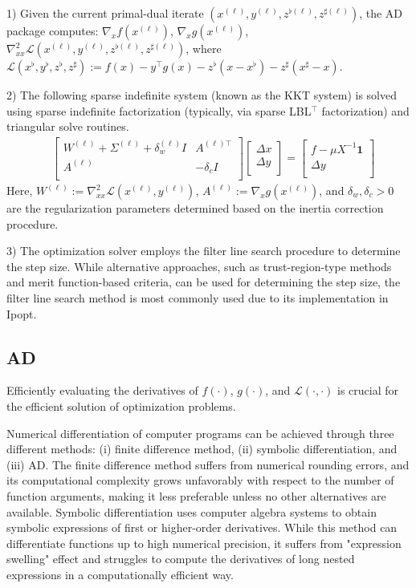 1) Given the current primal-dual iterate $(x^{(\ell)},y^{(\ell)},
z^{\flat(\ell)},z^{\sharp(\ell)})$, the AD package computes:
$\nabla_x f(x^{(\ell)})$, $\nabla_x g(x^{(\ell)})$, $\nabla^2_{xx}
\mathcal{L}(x^{(\ell)},y^{(\ell)},z^{\flat(\ell)},z^{\sharp(\ell)})$, where
$\mathcal{L}(x^{\flat},y^{\flat},z^{\flat},z^{\sharp}):=f(x) - y^\top
g(x) - z^\flat (x-x^\flat) - z^\sharp (x^\sharp-x)$.

2) The following sparse indefinite system (known as the KKT system) is
solved using sparse indefinite factorization (typically, via sparse
LBL$^\top$ factorization) and triangular solve routines.
\begin{align}\label{eqn:kkt-indefinite}
  &\begin{bmatrix}
    W^{(\ell)}  + \Sigma^{(\ell)} + \delta^{(\ell)}_w I& A^{(\ell)\top}\\
    A^{(\ell)} & -\delta_c I\\
  \end{bmatrix}
  \begin{bmatrix}
    \Delta x\\
    \Delta y\\
  \end{bmatrix}=
  \begin{bmatrix}
    f - \mu X^{-1} \boldsymbol{1}\\
    \Delta y\\
  \end{bmatrix}
\end{align}
Here, $W^{(\ell)}:=\nabla^{2}_{xx}\mathcal{L}(x^{(\ell)},y^{(\ell)})$,
$A^{(\ell)}:= \nabla_xg(x^{(\ell)})$, and $\delta_w, \delta_c>0$ are
the regularization parameters determined based on the inertia
correction procedure.

3) The optimization solver employs the filter line search procedure to
determine the step size. While alternative approaches, such as
trust-region-type methods and merit function-based criteria, can be
used for determining the step size, the filter line search method is
most commonly used due to its implementation in Ipopt.

\subsection{AD}
Efficiently evaluating the derivatives of $f(\cdot)$, $g(\cdot)$, and
$\mathcal{L}(\cdot,\cdot)$ is crucial for the efficient solution of
optimization problems.

Numerical differentiation of computer programs can be achieved through
three different methods: (i) finite difference method, (ii) symbolic
differentiation, and (iii) AD. The finite difference method suffers
from numerical rounding errors, and its computational complexity grows
unfavorably with respect to the number of function arguments, making
it less preferable unless no other alternatives are
available. Symbolic differentiation uses computer algebra systems to
obtain symbolic expressions of first or higher-order
derivatives. While this method can differentiate functions up to high
numerical precision, it suffers from "expression swelling" effect and
struggles to compute the derivatives of long nested expressions in a
computationally efficient way.


